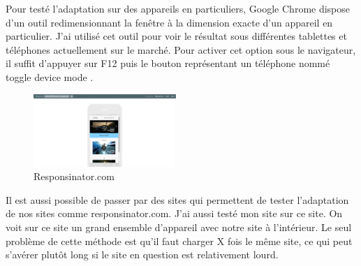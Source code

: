 \documentclass{article}
\begin{document}
Pour test\'e l'adaptation sur des appareils en particuliers, Google Chrome dispose d'un outil redimensionnant la fen\^etre \`a la dimension exacte d'un appareil en particulier. J'ai utilis\'e cet outil pour voir le r\'esultat sous diff\'erentes tablettes et t\'el\'ephones actuellement sur le march\'e. Pour activer cet option sous le navigateur, il suffit d'appuyer sur F12 puis le bouton repr\'esentant un t\'el\'ephone nomm\'e \og toggle device mode \fg{}.
\vspace{0.5cm}\\
\begin{figure}
  \vspace{-25pt}
  \begin{center}
    \includegraphics[width=0.48\textwidth]{p17}
  \end{center}
  \vspace{-20pt}
  \caption{Responsinator.com}
  \vspace{-10pt}
\end{figure} 

Il est aussi possible de passer par des sites qui permettent de tester l'adaptation de nos sites comme responsinator.com. J'ai aussi test\'e mon site sur ce site. On voit sur ce site un grand ensemble d'appareil avec notre site \`a l'int\'erieur. Le seul probl\`eme de cette m\'ethode est qu'il faut charger X fois le m\^eme site, ce qui peut s'av\'erer plut\^ot long si le site en question est relativement lourd.\\

\newpage
\end{document}
